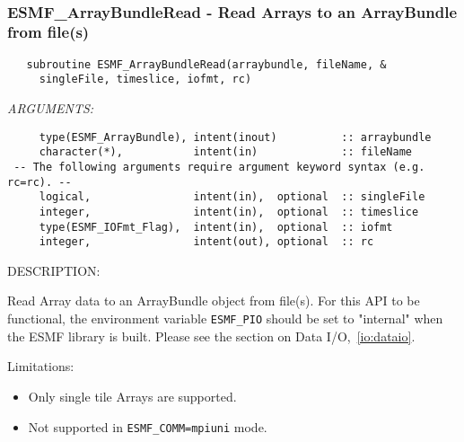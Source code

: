  
\mbox{}\hrulefill\ 
 
\subsubsection [ESMF\_ArrayBundleRead] {ESMF\_ArrayBundleRead - Read Arrays to an ArrayBundle from file(s)}


   \label{api:ArrayBundleRead}
 
\begin{verbatim}   subroutine ESMF_ArrayBundleRead(arraybundle, fileName, &
     singleFile, timeslice, iofmt, rc)\end{verbatim}{\em ARGUMENTS:}
\begin{verbatim}     type(ESMF_ArrayBundle), intent(inout)          :: arraybundle
     character(*),           intent(in)             :: fileName
 -- The following arguments require argument keyword syntax (e.g. rc=rc). --
     logical,                intent(in),  optional  :: singleFile
     integer,                intent(in),  optional  :: timeslice
     type(ESMF_IOFmt_Flag),  intent(in),  optional  :: iofmt
     integer,                intent(out), optional  :: rc\end{verbatim}
{\sf DESCRIPTION:\\ }


     Read Array data to an ArrayBundle object from file(s).
     For this API to be functional, the environment variable {\tt ESMF\_PIO} 
     should be set to "internal" when the ESMF library is built.
     Please see the section on Data I/O,~\ref{io:dataio}.
  
     Limitations:
     \begin{itemize}
       \item Only single tile Arrays are supported.
       \item Not supported in {\tt ESMF\_COMM=mpiuni} mode.
     \end{itemize}
  
